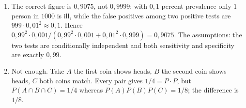 \begin{enumerate}[label=\textbf{17.\arabic*}]
  \item 
The correct figure is $0{,}9075$, not $0{,}9999$: with $0{,}1$ percent
        prevalence only $1$ person in $1000$ is ill, while the false positives among
        two positive tests are $999\cdot0{,}01^{2}\approx0{,}1$. Hence
        $0{,}99^{2}\cdot0{,}001/(0{,}99^{2}\cdot0{,}001+0{,}01^{2}\cdot0{,}999)=0{,}9075$.
        The assumptions: the two tests are conditionally independent and both
        sensitivity and specificity are exactly $0{,}99$.

  \item Not enough. Take $A$ the first coin shows heads, $B$ the second coin shows
        heads, $C$ both coins match. Every pair gives $1/4=P\cdot P$, but
        $P(A\cap B\cap C)=1/4$ whereas $P(A)P(B)P(C)=1/8$; the difference is $1/8$.
\end{enumerate}

